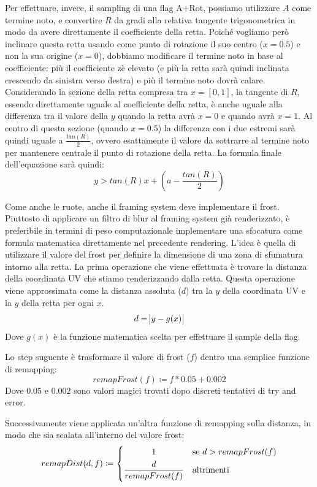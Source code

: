 \documentclass[main.tex]{subfiles}
\begin{document}
Per effettuare, invece, il sampling di una flag A+Rot, possiamo utilizzare $A$ come termine noto, e convertire $R$ da gradi alla relativa tangente trigonometrica in modo da avere direttamente il coefficiente della retta. Poiché vogliamo però inclinare questa retta usando come punto di rotazione il suo centro ($x = 0.5$) e non la sua origine ($x = 0$), dobbiamo modificare il termine noto in base al coefficiente: più il coefficiente zè elevato (e più la retta sarà quindi inclinata crescendo da sinistra verso destra) e più il termine noto dovrà calare. Considerando la sezione della retta compresa tra $x = [0, 1]$, la tangente di $R$, essendo direttamente uguale al coefficiente della retta, è anche uguale alla differenza tra il valore della $y$ quando la retta avrà $x = 0$ e quando avrà $x = 1$. Al centro di questa sezione (quando $x = 0.5$) la differenza con i due estremi sarà quindi uguale a $\frac{tan(R)}{2}$, ovvero esattamente il valore da sottrarre al termine noto per mantenere centrale il punto di rotazione della retta. La formula finale dell'equazione sarà quindi:
\[y > tan(R)x + (a - \frac{tan(R)}{2})\]

Come anche le ruote, anche il framing system deve implementare il frost. Piuttosto di applicare un filtro di blur al framing system già renderizzato, è preferibile in termini di peso computazionale implementare una sfocatura come formula matematica direttamente nel precedente rendering. L'idea è quella di utilizzare il valore del frost per definire la dimensione di una zona di sfumatura intorno alla retta. La prima operazione che viene effettuata è trovare la distanza della coordinata UV che stiamo renderizzando dalla retta. Questa operazione viene approssimata come la distanza assoluta ($d$) tra la $y$ della coordinata UV e la $y$ della retta per ogni $x$.
\[d = \abs{y - g(x)}\]
Dove $g(x)$ è la funzione matematica scelta per effettuare il sample della flag.

Lo step suguente è trasformare il valore di frost ($f$) dentro una semplice funzione di remapping:
\[remapFrost(f) \coloneqq f * 0.05 + 0.002\]
Dove $0.05$ e $0.002$ sono valori magici trovati dopo discreti tentativi di try and error.

Successivamente viene applicata un'altra funzione di remapping sulla distanza, in modo che sia scalata all'interno del valore frost:
\[remapDist(d, f) \coloneqq 
	\begin{dcases}
		\hfil 1 & \text{se } d > remapFrost(f)\\
		\frac{d}{remapFrost(f)} & \text{altrimenti}
	\end{dcases}
\]
\end{document}

